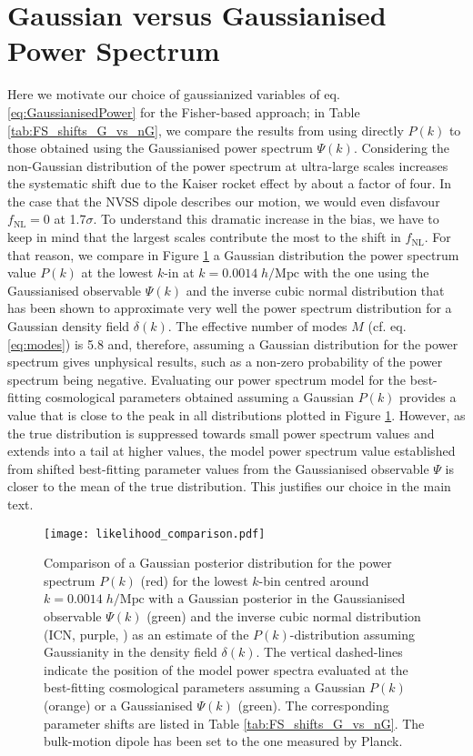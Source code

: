 \documentclass[a4paper,11pt]{article}
\begin{document}
\section{Gaussian versus Gaussianised Power Spectrum}
\label{G_vs_nG}
Here we motivate our choice of gaussianized variables  of eq. \eqref{eq:GaussianisedPower} for the Fisher-based approach;   
in Table \ref{tab:FS_shifts_G_vs_nG}, we compare the results from using directly  $P(k)$ to those obtained using the Gaussianised power spectrum $\Psi(k)$. Considering the non-Gaussian distribution of the power spectrum at ultra-large scales increases the systematic shift due to the Kaiser rocket effect by about a factor of four. In the case that the NVSS dipole describes our motion, we would even disfavour $f_\mathrm{NL}=0$ at 1.7$\sigma$. To understand this dramatic increase in the bias, we have to keep in mind that the largest scales contribute the most to the shift in $f_\mathrm{NL}$. For that reason, we compare in Figure \ref{fig:Gauss_vs_nonGauss} a Gaussian distribution  the power spectrum value $P(k)$ at the lowest $k$-in at $k=0.0014\;h/\mathrm{Mpc}$ with the one using the Gaussianised observable $\Psi(k)$ and the inverse cubic normal distribution \cite[ICN]{Kalus:2015lna} that has been shown to  approximate very well the power spectrum distribution for a Gaussian density field $\delta(k)$. The effective number of modes $M$ (cf. eq. \eqref{eq:modes}) is 5.8 and, therefore, assuming a Gaussian distribution for the power spectrum gives unphysical results, such as a non-zero probability of the power spectrum being negative. Evaluating our power spectrum model for the best-fitting cosmological parameters obtained assuming a Gaussian $P(k)$ provides a value that is close to the peak in all distributions plotted in Figure \ref{fig:Gauss_vs_nonGauss}. However, as the true distribution is suppressed towards small power spectrum values and extends into a tail at higher values, the model power spectrum value established from shifted best-fitting parameter values from the Gaussianised observable $\Psi$ is closer to the mean of the true distribution. This justifies our choice in the main text.

\begin{figure}
    \centering
    \texttt{[image: likelihood\_comparison.pdf]}
    \caption{Comparison of a Gaussian posterior distribution for the power spectrum $P(k)$ (red) for the lowest $k$-bin centred around $k=0.0014\;h/\mathrm{Mpc}$ with a Gaussian posterior in the Gaussianised observable $\Psi(k)$ (green) and the inverse cubic normal distribution (ICN, purple, \cite{Kalus:2015lna}) as an estimate of the $P(k)$-distribution assuming Gaussianity in the density field $\delta(k)$. The vertical dashed-lines indicate the position of the model power spectra evaluated at the best-fitting cosmological parameters assuming a Gaussian $P(k)$ (orange) or a Gaussianised $\Psi(k)$ (green). The corresponding parameter shifts are listed in Table \ref{tab:FS_shifts_G_vs_nG}. The bulk-motion dipole has been set to the one measured by Planck.}
    \label{fig:Gauss_vs_nonGauss}
\end{figure}
\end{document}
